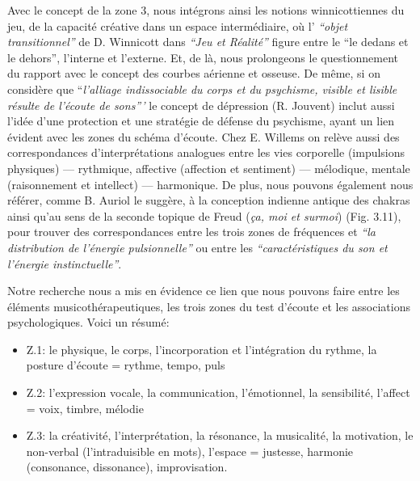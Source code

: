 Avec le concept de la zone 3, nous intégrons ainsi les notions winnicottiennes du jeu, de la 
capacité
créative dans un espace
intermédiaire, où l' \textit{``objet
	transitionnel'' } de D. Winnicott dans \textit{``Jeu et Réalité''}
\autocite{winnicott}
figure entre le ``le
dedans et le
dehors'',
l'interne et l'externe.  Et, de là, nous prolongeons le questionnement du
rapport avec le concept des
courbes aérienne et osseuse.
De même, si on considère que ``\emph{l'alliage indissociable du corps et du psychisme,
	visible et lisible résulte de l'écoute de
	sons'''}\autocite{tomatis_conf1972}
	 le concept de dépression (R. Jouvent) \autocite{doronparot}  inclut aussi l'idée d'une protection et 
	 une stratégie de
défense du psychisme, ayant un lien évident avec les zones du schéma d'écoute.
Chez E. Willems \autocite{willems} 
on relève aussi des correspondances d'interprétations 
	analogues entre les vies
corporelle (impulsions physiques)
--- rythmique, affective (affection et sentiment) --- mélodique, mentale
(raisonnement et intellect) --- harmonique.
     De plus, nous pouvons également nous référer, comme B. Auriol le suggère, à la conception indienne 
     antique des chakras
ainsi qu'au sens de la seconde
topique de Freud (\textit{ça, moi et surmoi}) (Fig. 3.11), pour trouver des correspondances
entre les trois zones de
fréquences et \textit {``la distribution de l'énergie pulsionnelle''} ou entre
les
\textit{``caractéristiques du son et l'énergie
	instinctuelle''}\autocite[ch. 13]{auriol:cle}.

Notre recherche nous a mis en évidence ce lien que nous pouvons faire entre 
 les éléments musicothérapeutiques, les trois zones du
	test d'écoute et les associations psychologiques. 
Voici un résumé: 
\begin{itemize}
	\item  Z.1: le physique, le corps, l'incorporation et
	l'intégration du rythme,
	la posture d'écoute  =  rythme, tempo, puls
	\item  Z.2:  l'expression vocale, la communication,
	l'émotionnel, la sensibilité, l'affect = voix, timbre, mélodie
	\item Z.3: la créativité, l'interprétation, la
	résonance, la musicalité, la motivation, le non-verbal (l'intraduisible en mots), l'espace = justesse, 
	harmonie (consonance,
	dissonance), improvisation.

\end{itemize}

